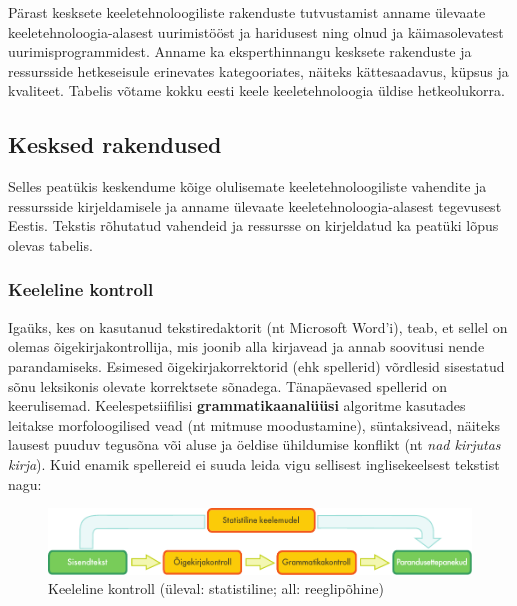 \begin{multicols}{2}
Pärast kesksete keeletehnoloogiliste rakenduste tutvustamist anname ülevaate keeletehnoloogia-alasest uurimistööst ja haridusest ning olnud ja käimasolevatest uurimisprogrammidest. 
Anname ka eksperthinnangu kesksete rakenduste ja ressursside hetkeseisule erinevates kategooriates, näiteks kättesaadavus, küpsus ja kvaliteet. 
Tabelis võtame kokku eesti keele keeletehnoloogia üldise hetkeolukorra. 

\subsection{Kesksed rakendused} 

Selles peatükis keskendume kõige olulisemate keeletehnoloogiliste vahendite ja ressursside kirjeldamisele ja anname ülevaate keeletehnoloogia-alasest tegevusest Eestis. 
Tekstis rõhutatud vahendeid ja ressursse on kirjeldatud ka peatüki lõpus olevas tabelis.

\subsubsection{Keeleline kontroll}

Igaüks, kes on kasutanud tekstiredaktorit (nt Microsoft Word’i), teab, et sellel on olemas õigekirjakontrollija, mis joonib alla kirjavead ja annab soovitusi nende parandamiseks.  Esimesed õigekirjakorrektorid (ehk spellerid) võrdlesid sisestatud sõnu leksikonis olevate korrektsete sõnadega.  Tänapäevased spellerid on keerulisemad.  Keelespetsiifilisi \textbf{grammatikaanalüüsi} algoritme kasutades leitakse morfoloogilised vead (nt mitmuse moodustamine), süntaksivead, näiteks lausest puuduv tegusõna või aluse ja öeldise ühildumise konflikt (nt \textit{nad kirjutas kirja}).  Kuid enamik spellereid ei suuda leida vigu sellisest inglisekeelsest tekstist \cite{zar1} nagu:

\begin{figure}[htb]
  \center
  \includegraphics[width=\textwidth]{../_media/estonian/language_checking}
  \caption{Keeleline kontroll (üleval: statistiline; all: reeglipõhine)}
  \label{fig:langcheckingaarch_ee}
\end{figure}


\end{multicols}
